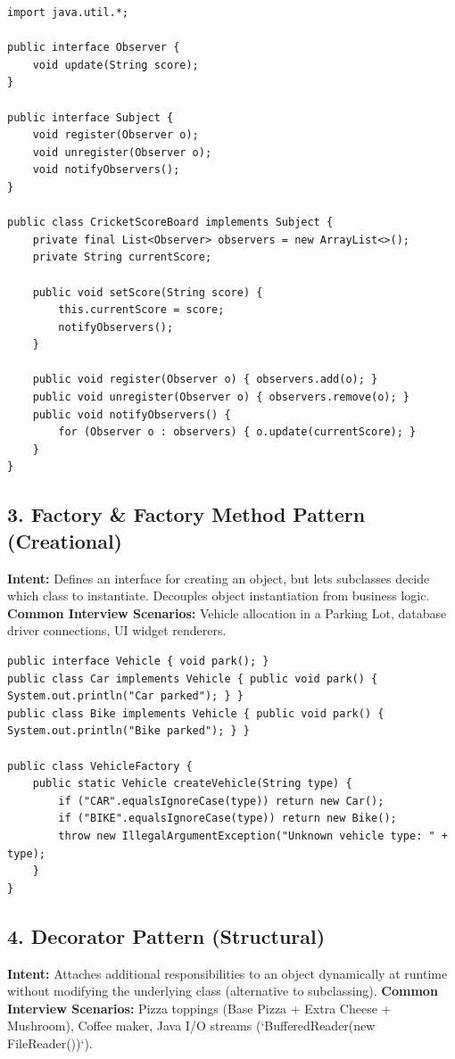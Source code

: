 \documentclass[10pt,journal,compsoc,onecolumn]{IEEEtran}
\begin{document}
\begin{verbatim}
import java.util.*;

public interface Observer {
    void update(String score);
}

public interface Subject {
    void register(Observer o);
    void unregister(Observer o);
    void notifyObservers();
}

public class CricketScoreBoard implements Subject {
    private final List<Observer> observers = new ArrayList<>();
    private String currentScore;

    public void setScore(String score) {
        this.currentScore = score;
        notifyObservers();
    }

    public void register(Observer o) { observers.add(o); }
    public void unregister(Observer o) { observers.remove(o); }
    public void notifyObservers() {
        for (Observer o : observers) { o.update(currentScore); }
    }
}
\end{verbatim}

\subsection{3. Factory \& Factory Method Pattern (Creational)}
\textbf{Intent:} Defines an interface for creating an object, but lets subclasses decide which class to instantiate. Decouples object instantiation from business logic.
\textbf{Common Interview Scenarios:} Vehicle allocation in a Parking Lot, database driver connections, UI widget renderers.

\begin{verbatim}
public interface Vehicle { void park(); }
public class Car implements Vehicle { public void park() { System.out.println("Car parked"); } }
public class Bike implements Vehicle { public void park() { System.out.println("Bike parked"); } }

public class VehicleFactory {
    public static Vehicle createVehicle(String type) {
        if ("CAR".equalsIgnoreCase(type)) return new Car();
        if ("BIKE".equalsIgnoreCase(type)) return new Bike();
        throw new IllegalArgumentException("Unknown vehicle type: " + type);
    }
}
\end{verbatim}

\subsection{4. Decorator Pattern (Structural)}
\textbf{Intent:} Attaches additional responsibilities to an object dynamically at runtime without modifying the underlying class (alternative to subclassing).
\textbf{Common Interview Scenarios:} Pizza toppings (Base Pizza + Extra Cheese + Mushroom), Coffee maker, Java I/O streams (`BufferedReader(new FileReader())`).
\end{document}
